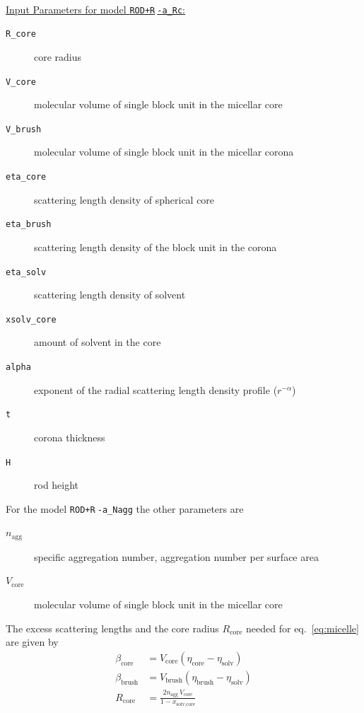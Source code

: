 \hspace{1pt}\\
\uline{Input Parameters for model \texttt{ROD+R$\hat{~}$-a\_Rc}:}
\begin{description}
\item[\texttt{R\_core}] core radius
\item[\texttt{V\_core}] molecular volume of single block unit in the micellar core
\item[\texttt{V\_brush}]  molecular volume of single block unit in the micellar corona
\item[\texttt{eta\_core}] scattering length density of spherical core
\item[\texttt{eta\_brush}] scattering length density of the block unit in the corona
\item[\texttt{eta\_solv}] scattering length density of solvent
\item[\texttt{xsolv\_core}] amount of solvent in the core
\item[\texttt{alpha}] exponent of the radial scattering length density profile ($r^{-\alpha}$)
\item[\texttt{t}] corona thickness
\item[\texttt{H}] rod height
\end{description}

\vspace{10mm}

\noindent
For the model \texttt{ROD+R$\hat{~}$-a\_Nagg} the other parameters are
\begin{description}
\item[$n_\text{agg}$] specific aggregation number, aggregation number per surface area
\item[$V_\text{core}$] molecular volume of single block unit in the micellar core
\end{description}
The excess scattering lengths and the core radius $R_\text{core}$ needed for eq.\
\ref{eq:micelle} are given by
\begin{align}
\beta_\text{core}  &= V_\text{core}  (\eta_\text{core} -\eta_\text{solv}) \\
\beta_\text{brush} &= V_\text{brush} (\eta_\text{brush}-\eta_\text{solv}) \\
R_\text{core} &=  \frac{2 n_\text{agg}\, V_\text{core}}{1-x_\text{solv,core}}
\end{align}


